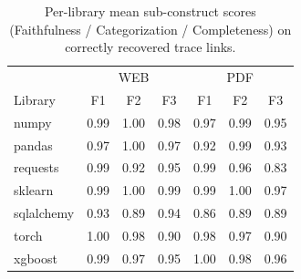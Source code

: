 \begin{table}[t]
\centering
\caption{Per-library mean sub-construct scores (Faithfulness / Categorization / Completeness) on correctly recovered trace links.}
\label{tab:fidelity-perlib}
\begin{tabular}{lccc|ccc}
\toprule
& \multicolumn{3}{c|}{WEB} & \multicolumn{3}{c}{PDF} \\
Library & F1 & F2 & F3 & F1 & F2 & F3 \\
\midrule
numpy & 0.99 & 1.00 & 0.98 & 0.97 & 0.99 & 0.95 \\
pandas & 0.97 & 1.00 & 0.97 & 0.92 & 0.99 & 0.93 \\
requests & 0.99 & 0.92 & 0.95 & 0.99 & 0.96 & 0.83 \\
sklearn & 0.99 & 1.00 & 0.99 & 0.99 & 1.00 & 0.97 \\
sqlalchemy & 0.93 & 0.89 & 0.94 & 0.86 & 0.89 & 0.89 \\
torch & 1.00 & 0.98 & 0.90 & 0.98 & 0.97 & 0.90 \\
xgboost & 0.99 & 0.97 & 0.95 & 1.00 & 0.98 & 0.96 \\
\bottomrule
\end{tabular}
\end{table}
